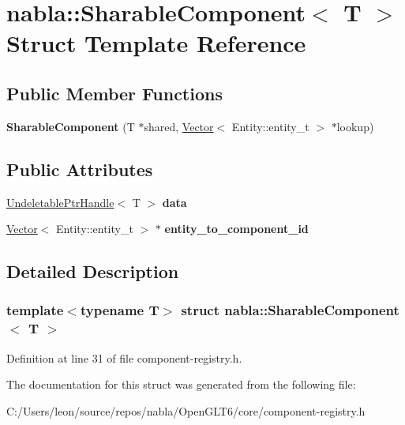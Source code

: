 \hypertarget{structnabla_1_1_sharable_component}{}\section{nabla\+::Sharable\+Component$<$ T $>$ Struct Template Reference}
\label{structnabla_1_1_sharable_component}
\subsection*{Public Member Functions}
\begin{DoxyCompactItemize}
\item 
\mbox{\label{structnabla_1_1_sharable_component_a66948fd88fd9e72ee9308675527933a9}} 
{\bfseries Sharable\+Component} (T $\ast$shared, \mbox{\hyperlink{classnabla_1_1_s_t_l_vector_ex}{Vector}}$<$ Entity\+::entity\+\_\+t $>$ $\ast$lookup)
\end{DoxyCompactItemize}
\subsection*{Public Attributes}
\begin{DoxyCompactItemize}
\item 
\mbox{\label{structnabla_1_1_sharable_component_a00e7dee9a30a4e54c137748b8ea7f74b}} 
\mbox{\hyperlink{structnabla_1_1_undeletable_ptr_handle}{Undeletable\+Ptr\+Handle}}$<$ T $>$ {\bfseries data}
\item 
\mbox{\label{structnabla_1_1_sharable_component_abdce182855122da5fdd3ad93692a9adf}} 
\mbox{\hyperlink{classnabla_1_1_s_t_l_vector_ex}{Vector}}$<$ Entity\+::entity\+\_\+t $>$ $\ast$ {\bfseries entity\+\_\+to\+\_\+component\+\_\+id}
\end{DoxyCompactItemize}


\subsection{Detailed Description}
\subsubsection*{template$<$typename T$>$\newline
struct nabla\+::\+Sharable\+Component$<$ T $>$}



Definition at line 31 of file component-\/registry.\+h.



The documentation for this struct was generated from the following file\+:\begin{DoxyCompactItemize}
\item 
C\+:/\+Users/leon/source/repos/nabla/\+Open\+G\+L\+T6/core/component-\/registry.\+h\end{DoxyCompactItemize}
